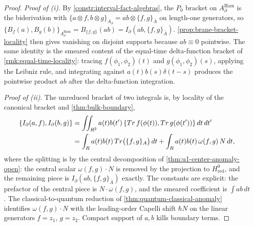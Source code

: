 \documentclass[11pt]{memoir}
\begin{document}
\begin{proof}
  \emph{Proof of (i).} By \ref{constr:interval-fact-algebras}, the
  $P_0$ bracket on $A_\partial^{\mathrm{Ham}}$ is the biderivation
  with $\{a\otimes f,b\otimes g\}_{A_\partial}=ab\otimes\{f,g\}_{\bar A}$
  on length-one generators, so
  $\{B_f(a),B_g(b)\}_{A_\partial^{\mathrm{Ham}}}=B_{\{f,g\}}(ab)
  =I_\partial(ab,\{f,g\}_{\bar A})$. \ref{prop:brane-bracket-locality}
  then gives vanishing on disjoint supports because
  $ab\equiv 0$ pointwise. The same identity is the smeared content of
  the equal-time delta-function bracket of
  \ref{rmk:equal-time-locality}: tracing
  $f(\phi_1,\phi_2)(t)$ and $g(\phi_1,\phi_2)(s)$, applying the
  Leibniz rule, and integrating against $a(t)b(s)\delta(t-s)$ produces
  the pointwise product $ab$ after the delta-function integration.

  \emph{Proof of (ii).} The unreduced bracket of two integrals is, by
  locality of the canonical bracket and \ref{thm:bulk-boundary},
  \begin{align*}
    \{I_\partial(a,f),I_\partial(b,g)\}
    &=\iint_{R^2}a(t)b(t')\,
      \{Tr\,f(\phi(t)),Tr\,g(\phi(t'))\}\,dt\,dt'\\
    &=\int_{R} a(t)b(t)\,Tr\bigl(\{f,g\}_{A}\bigr)\,dt
      +\int_{R} a(t)b(t)\,\omega(f,g)\,N\,dt,
  \end{align*}
  where the splitting is by the central decomposition of
  \ref{thm:u1-center-anomaly-open}: the central scalar
  $\omega(f,g)\cdot N$ is removed by the projection to
  $H^0_{\mathrm{red}}$, and the remaining piece is
  $I_\partial(ab,\{f,g\}_{\bar A})$ exactly. The constants are
  explicit: the prefactor of the central piece is $N\cdot\omega(f,g)$,
  and the smeared coefficient is $\int ab\,dt$. The
  classical-to-quantum reduction of
  \ref{thm:quantum-classical-anomaly} identifies $\omega(f,g)\cdot N$
  with the leading-order Capelli shift $\hbar N$ on the linear
  generators $f=z_1$, $g=z_2$. Compact support of $a,b$ kills boundary
  terms.
\end{proof}
\end{document}
